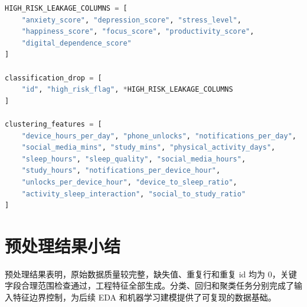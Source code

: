 \begin{lstlisting}[language=Python,caption={目标泄漏字段排除逻辑片段},label={lst:leakage-control}]
HIGH_RISK_LEAKAGE_COLUMNS = [
    "anxiety_score", "depression_score", "stress_level",
    "happiness_score", "focus_score", "productivity_score",
    "digital_dependence_score"
]

classification_drop = [
    "id", "high_risk_flag", *HIGH_RISK_LEAKAGE_COLUMNS
]

clustering_features = [
    "device_hours_per_day", "phone_unlocks", "notifications_per_day",
    "social_media_mins", "study_mins", "physical_activity_days",
    "sleep_hours", "sleep_quality", "social_media_hours",
    "study_hours", "notifications_per_device_hour",
    "unlocks_per_device_hour", "device_to_sleep_ratio",
    "activity_sleep_interaction", "social_to_study_ratio"
]
\end{lstlisting}

\section{预处理结果小结}

预处理结果表明，原始数据质量较完整，缺失值、重复行和重复 id 均为 0，关键字段合理范围检查通过，工程特征全部生成。分类、回归和聚类任务分别完成了输入特征边界控制，为后续 EDA 和机器学习建模提供了可复现的数据基础。
